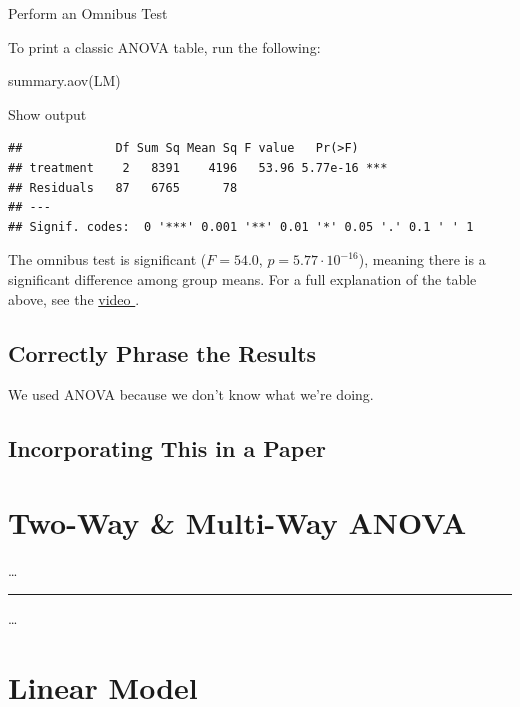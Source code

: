\documentclass[
]{book}
\newenvironment{Shaded}{\begin{snugshade}}{\end{snugshade}}
\newcommand{\FunctionTok}[1]{\textcolor[rgb]{0.00,0.00,0.00}{#1}}
\newcommand{\NormalTok}[1]{#1}
\begin{document}
Perform an Omnibus Test

To print a classic ANOVA table, run the following:

\begin{Shaded}
\begin{Highlighting}[]
\FunctionTok{summary.aov}\NormalTok{(LM)}
\end{Highlighting}
\end{Shaded}

Show output

\begin{verbatim}
##             Df Sum Sq Mean Sq F value   Pr(>F)    
## treatment    2   8391    4196   53.96 5.77e-16 ***
## Residuals   87   6765      78                     
## ---
## Signif. codes:  0 '***' 0.001 '**' 0.01 '*' 0.05 '.' 0.1 ' ' 1
\end{verbatim}

The omnibus test is significant (\(F = 54.0\), \(p = 5.77 \cdot 10^{-16}\)), meaning there is a significant difference among group means. For a full explanation of the table above, see the \href{https://youtu.be/BFB4o4uBgPs}{video }.

\hypertarget{results-ANOVA}{%
\section{Correctly Phrase the Results}\label{results-ANOVA}}

We used ANOVA because we don't know what we're doing.

\hypertarget{incorporating-this-in-a-paper-2}{%
\section{Incorporating This in a Paper}\label{incorporating-this-in-a-paper-2}}

\hypertarget{twowaymultiway}{%
\chapter{Two-Way \& Multi-Way ANOVA}\label{twowaymultiway}}

\ldots{}

\begin{center}\rule{0.5\linewidth}{0.5pt}\end{center}

\ldots{}

\hypertarget{linear-model}{%
\chapter{Linear Model}\label{linear-model}}
\end{document}
